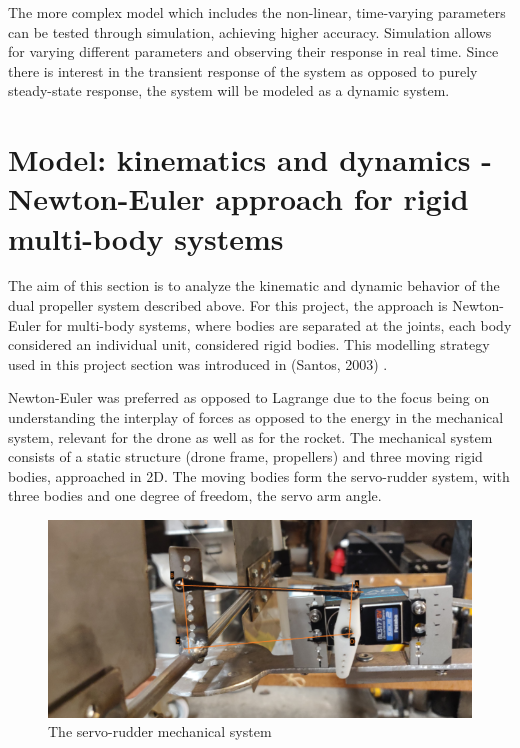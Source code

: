 The more complex model which includes the non-linear, time-varying parameters can be tested through simulation, achieving higher accuracy. Simulation allows for varying different parameters and observing their response in real time. Since there is interest in the transient response of the system as opposed to purely steady-state response, the system will be modeled as a dynamic system.

\section{Model: kinematics and dynamics - Newton-Euler approach for rigid multi-body systems}


The aim of this section is to analyze the kinematic and dynamic behavior of the dual propeller system described above. For this project, the approach is Newton-Euler for multi-body systems, where bodies are separated at the joints, each body considered an individual unit, considered rigid bodies. This modelling strategy used in this project section was introduced in (Santos, 2003) \cite{santos2001dinamica}. 

Newton-Euler was preferred as opposed to Lagrange due to the focus being on understanding the interplay of forces as opposed to the energy in the mechanical system, relevant for the drone as well as for the rocket. The mechanical system consists of a static structure (drone frame, propellers) and three moving rigid bodies, approached in 2D. The moving bodies form the servo-rudder system, with three bodies and one degree of freedom, the servo arm angle. 

\begin{figure}[h!]
  \centering
  \includegraphics[scale=0.8]{graphics/ConstraintServoPic.png}
  \caption{The servo-rudder mechanical system}
  \label{fig:Servo-rudder mechanical system}
\end{figure}


